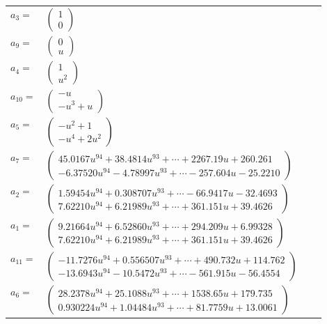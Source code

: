 \documentclass[1p]{elsarticle_modified}
\theoremstyle{definition}
\begin{document}
\begin{tabular}{m{7pt} m{180pt} m{7pt} m{180pt} }
\flushright $a_{3}=$&$\begin{pmatrix}1\\0\end{pmatrix}$ \\
\flushright $a_{9}=$&$\begin{pmatrix}0\\u\end{pmatrix}$ \\
\flushright $a_{4}=$&$\begin{pmatrix}1\\u^2\end{pmatrix}$ \\
\flushright $a_{10}=$&$\begin{pmatrix}- u\\- u^3+u\end{pmatrix}$ \\
\flushright $a_{5}=$&$\begin{pmatrix}- u^2+1\\- u^4+2 u^2\end{pmatrix}$ \\
\flushright $a_{7}=$&$\begin{pmatrix}45.0167 u^{94}+38.4814 u^{93}+\cdots+2267.19 u+260.261\\-6.37520 u^{94}-4.78997 u^{93}+\cdots-257.604 u-25.2210\end{pmatrix}$ \\
\flushright $a_{2}=$&$\begin{pmatrix}1.59454 u^{94}+0.308707 u^{93}+\cdots-66.9417 u-32.4693\\7.62210 u^{94}+6.21989 u^{93}+\cdots+361.151 u+39.4626\end{pmatrix}$ \\
\flushright $a_{1}=$&$\begin{pmatrix}9.21664 u^{94}+6.52860 u^{93}+\cdots+294.209 u+6.99328\\7.62210 u^{94}+6.21989 u^{93}+\cdots+361.151 u+39.4626\end{pmatrix}$ \\
\flushright $a_{11}=$&$\begin{pmatrix}-11.7276 u^{94}+0.556507 u^{93}+\cdots+490.732 u+114.762\\-13.6943 u^{94}-10.5472 u^{93}+\cdots-561.915 u-56.4554\end{pmatrix}$ \\
\flushright $a_{6}=$&$\begin{pmatrix}28.2378 u^{94}+25.1088 u^{93}+\cdots+1538.65 u+179.735\\0.930224 u^{94}+1.04484 u^{93}+\cdots+81.7759 u+13.0061\end{pmatrix}$ \\

\end{tabular}
\end{document}
